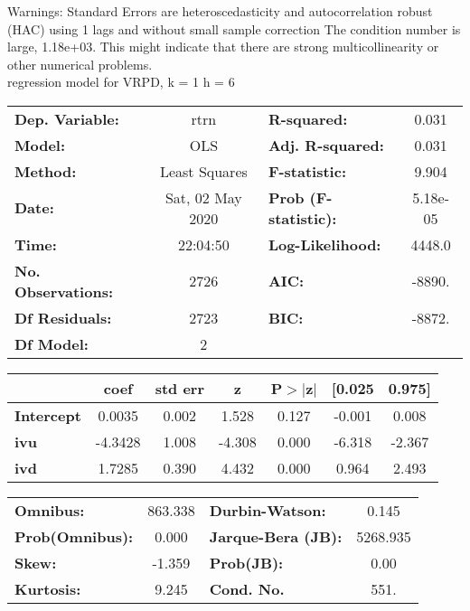 Warnings: \newline
 [1] Standard Errors are heteroscedasticity and autocorrelation robust (HAC) using 1 lags and without small sample correction \newline
 [2] The condition number is large, 1.18e+03. This might indicate that there are \newline
 strong multicollinearity or other numerical problems.\\ 

regression model for VRPD, k = 1 h = 6\begin{center}
\begin{tabular}{lclc}
\toprule
\textbf{Dep. Variable:}    &       rtrn       & \textbf{  R-squared:         } &     0.031   \\
\textbf{Model:}            &       OLS        & \textbf{  Adj. R-squared:    } &     0.031   \\
\textbf{Method:}           &  Least Squares   & \textbf{  F-statistic:       } &     9.904   \\
\textbf{Date:}             & Sat, 02 May 2020 & \textbf{  Prob (F-statistic):} &  5.18e-05   \\
\textbf{Time:}             &     22:04:50     & \textbf{  Log-Likelihood:    } &    4448.0   \\
\textbf{No. Observations:} &        2726      & \textbf{  AIC:               } &    -8890.   \\
\textbf{Df Residuals:}     &        2723      & \textbf{  BIC:               } &    -8872.   \\
\textbf{Df Model:}         &           2      & \textbf{                     } &             \\
\bottomrule
\end{tabular}
\begin{tabular}{lcccccc}
                   & \textbf{coef} & \textbf{std err} & \textbf{z} & \textbf{P$> |$z$|$} & \textbf{[0.025} & \textbf{0.975]}  \\
\midrule
\textbf{Intercept} &       0.0035  &        0.002     &     1.528  &         0.127        &       -0.001    &        0.008     \\
\textbf{ivu}       &      -4.3428  &        1.008     &    -4.308  &         0.000        &       -6.318    &       -2.367     \\
\textbf{ivd}       &       1.7285  &        0.390     &     4.432  &         0.000        &        0.964    &        2.493     \\
\bottomrule
\end{tabular}
\begin{tabular}{lclc}
\textbf{Omnibus:}       & 863.338 & \textbf{  Durbin-Watson:     } &    0.145  \\
\textbf{Prob(Omnibus):} &   0.000 & \textbf{  Jarque-Bera (JB):  } & 5268.935  \\
\textbf{Skew:}          &  -1.359 & \textbf{  Prob(JB):          } &     0.00  \\
\textbf{Kurtosis:}      &   9.245 & \textbf{  Cond. No.          } &     551.  \\
\bottomrule
\end{tabular}
\end{center}

